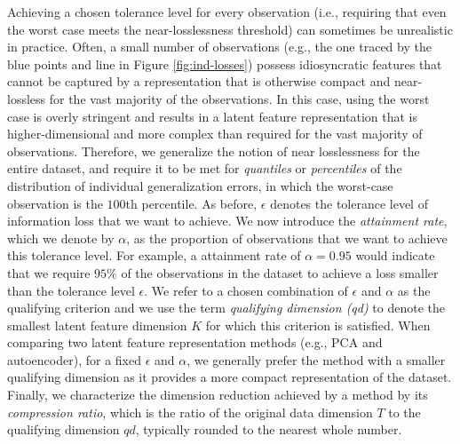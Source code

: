 Achieving a chosen tolerance level for every observation (i.e., requiring that even the worst case meets the near-losslessness threshold) can sometimes be unrealistic in practice.
Often, a small number of observations (e.g., the one traced by the blue points and line in Figure \ref{fig:ind-losses}) possess idiosyncratic features that cannot be captured by a representation that is otherwise compact and near-lossless for the vast majority of the observations.
In this case, using the worst case is overly stringent and results in a latent feature representation that is higher-dimensional and more complex than required for the vast majority of observations.
Therefore, we generalize the notion of near losslessness for the entire dataset, and require it to be met for \emph{quantiles} or \emph{percentiles} of the distribution of individual generalization errors, in which the worst-case observation is the $100$th percentile. 
As before, $\epsilon$ denotes the tolerance level of information loss that we want to achieve.
We now introduce the \emph{attainment rate}, which we denote by $\alpha$, as the proportion of observations that we want to achieve this tolerance level.
For example, a attainment rate of $\alpha = 0.95$ would indicate that we require $95\%$ of the observations in the dataset to achieve a loss smaller than the tolerance level $\epsilon$.
We refer to a chosen combination of $\epsilon$ and $\alpha$ as the qualifying criterion and we use the term \emph{qualifying dimension (qd)} to denote the smallest latent feature dimension $K$ for which this criterion is satisfied.
When comparing two latent feature representation methods (e.g., PCA and autoencoder), for a fixed $\epsilon$ and $\alpha$, we generally prefer the method with a smaller qualifying dimension as it provides a more compact representation of the dataset.
Finally, we characterize the dimension reduction achieved by a method by its \emph{compression ratio}, which is the ratio of the original data dimension $T$ to the qualifying dimension $qd$, typically rounded to the nearest whole number.

